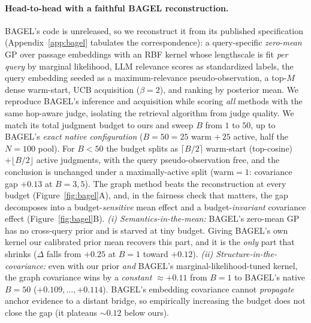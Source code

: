 \documentclass[twoside]{article}
\theoremstyle{plain}
\theoremstyle{definition}
\begin{document}
\paragraph{Head-to-head with a faithful BAGEL reconstruction.} BAGEL's code is unreleased, so we reconstruct it
from its published specification \citep{bagel2026} (Appendix~\ref{app:bagel} tabulates the correspondence): a
query-specific \emph{zero-mean} GP over passage embeddings with an RBF kernel whose lengthscale is fit \emph{per
query} by marginal likelihood, LLM relevance scores as standardized labels, the query embedding seeded as a
maximum-relevance pseudo-observation, a top-$M$ dense warm-start, UCB acquisition ($\beta{=}2$), and ranking by
posterior mean. We reproduce BAGEL's inference and acquisition while scoring \emph{all} methods with the same
hop-aware judge, isolating the retrieval algorithm from judge quality. We match its total judgment budget to ours and sweep $B$ from $1$ to $50$, up to
BAGEL's \emph{exact native configuration} ($B{=}50=25$ warm $+\,25$ active, half the $N{=}100$ pool). For $B<50$
the budget splits as $\lceil B/2\rceil$ warm-start (top-cosine) $+\lfloor B/2\rfloor$ active judgments, with the
query pseudo-observation free, and the conclusion is unchanged under a maximally-active split (warm$=1$: covariance gap
$+0.13$ at $B{=}3,5$). The graph method beats the reconstruction at every budget (Figure~\ref{fig:bagel}A), and, in the fairness check
that matters, the gap decomposes into a budget-\emph{sensitive} mean effect and a budget-\emph{invariant} covariance effect
(Figure~\ref{fig:bagel}B). \emph{(i) Semantics-in-the-mean:} BAGEL's zero-mean GP has no cross-query prior and is
starved at tiny budget. Giving BAGEL's own kernel our calibrated prior mean recovers this part, and it is the
\emph{only} part that shrinks ($\Delta$ falls from $+0.25$ at $B{=}1$ toward $+0.12$). \emph{(ii)
Structure-in-the-covariance:} even with our prior \emph{and} BAGEL's marginal-likelihood-tuned kernel, the graph
covariance wins by a \emph{constant} $\approx+0.11$ from $B{=}1$ to BAGEL's native $B{=}50$
($+0.109,\dots,+0.114$). BAGEL's embedding covariance cannot \emph{propagate} anchor evidence to a distant bridge,
so empirically increasing the budget does not close the gap (it plateaus $\sim0.12$ below ours).
\end{document}
